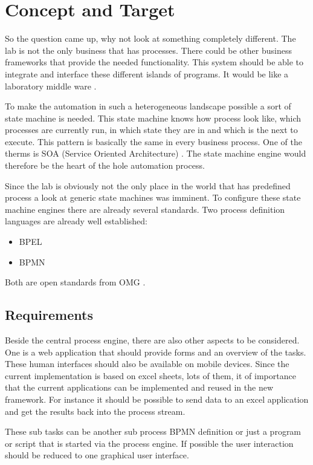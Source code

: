 \documentclass[paper=a4,twoside=false,BCOR=0mm,DIV=calc,fontsize=12pt]{scrartcl}
\begin{document}
\section{Concept and Target}
So the question came up, why not look at something completely different. The lab is not the only business that has processes. There could be other business frameworks that provide the needed functionality. This system should be able to integrate and interface these different islands of programs. It would be like a laboratory middle ware \cite{middleware}. 

To make the automation in such a heterogeneous landscape possible a sort of state machine is needed. This state machine knows how process look like, which processes are currently run, in which state they are in and which is the next to execute.
This pattern is basically the same in every business process. One of the therms is SOA (Service Oriented Architecture) \cite{soa}. The state machine engine would therefore be the heart of the hole automation process.

Since the lab is obviously not the only place in the world that has predefined process a look at generic state machines was imminent.
To configure these state  machine engines there are already several standards. Two process definition languages are already well established:

\begin{itemize}
 \item BPEL
 \item BPMN
\end{itemize}

Both are open standards from OMG \cite{omg}.



\subsection{Requirements}
Beside the central process engine, there are also other aspects to be considered. One is a web application that should provide forms and an overview
of the tasks. These human interfaces should also be available on mobile devices.
Since the current implementation is based on excel sheets, lots of them, it of importance that the current applications can be implemented and reused in the new framework.
For instance it should be possible to send data to an excel application and get the results back into the process stream.

These sub tasks can be another sub process BPMN definition or just a program or script that is started via the process engine. If possible the user interaction should be reduced to one graphical user interface. 
\end{document}
